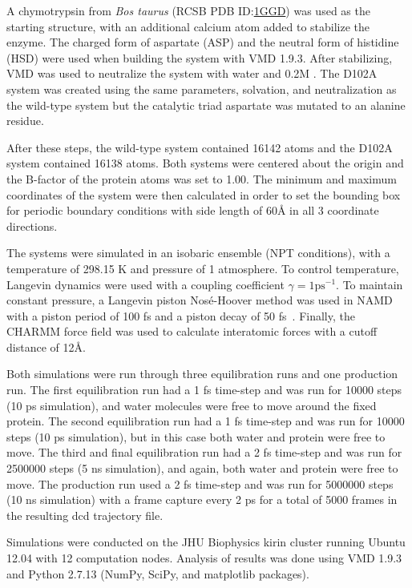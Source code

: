 \documentclass[11pt, twocolumn]{article}
\begin{document}
A chymotrypsin from \textit{Bos taurus}
(RCSB PDB ID:\@ \href{http://www.rcsb.org/pdb/explore.do?structureId=1ggd}{1GGD})
was used as the starting structure, with an additional calcium atom added to
stabilize the enzyme. The charged form of aspartate (ASP) and the neutral form
of histidine (HSD) were used when building the system with VMD 1.9.3. After
stabilizing, VMD was used to neutralize the system with water and 0.2M .
The D102A system was created using the same parameters, solvation, and
neutralization as the wild-type system but the catalytic triad aspartate was
mutated to an alanine residue.

After these steps, the wild-type system contained 16142 atoms and the D102A
system contained 16138 atoms. Both systems were centered about the origin and
the B-factor of the protein atoms was set to 1.00. The minimum and maximum
coordinates of the system were then calculated in order to set the bounding
box for periodic boundary conditions with side length of 60\AA{} in all 3
coordinate directions.

The systems were simulated in an isobaric ensemble (NPT conditions), with a
temperature of 298.15 K and pressure of 1 atmosphere. To control temperature,
Langevin dynamics were used with a coupling coefficient
\(\gamma = 1 \mathrm{ps}^{-1}\). To maintain constant pressure, a Langevin
piston Nos\'e-Hoover method was used in NAMD with a piston period of
100 fs and a piston decay of 50 fs~\cite{namd05}. Finally, the CHARMM
force field was used to calculate interatomic forces with a cutoff distance
of 12\AA{}.

Both simulations were run through three equilibration runs and one production
run. The first equilibration run had a 1 fs time-step and was run for 10000
steps (10 ps simulation), and water molecules were free to move around the
fixed protein.
The second equilibration run had a 1 fs time-step and was run for 10000 steps
(10 ps simulation), but in this case both water and protein were free to move.
The third and final equilibration run had a 2 fs time-step and was run for
2500000 steps (5 ns simulation), and again, both water and protein were free
to move.
The production run used a 2 fs time-step and was run for 5000000 steps (10 ns
simulation) with a frame capture every 2 ps for a total of 5000 frames in the
resulting dcd trajectory file.

Simulations were conducted on the JHU Biophysics kirin cluster running Ubuntu
12.04 with 12 computation nodes. Analysis of results was done using VMD 1.9.3
and Python 2.7.13 (NumPy, SciPy, and matplotlib packages).
\end{document}
